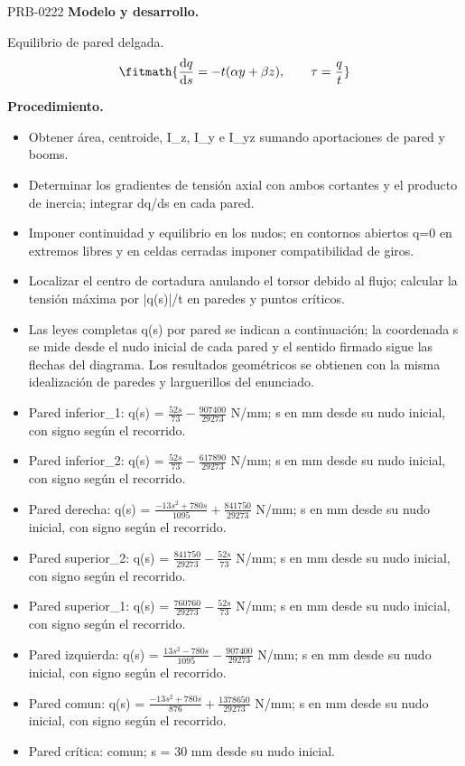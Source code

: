 \begin{studiumworked}{PRB-0222}
\textbf{Modelo y desarrollo.}

Equilibrio de pared delgada.\[\fitmath{\frac{\mathrm{d}q}{\mathrm{d}s}=-t(\alpha y+\beta z),\qquad \tau=\frac{q}{t}}\]

\textbf{Procedimiento.}\begin{itemize}\item Obtener área, centroide, I\_z, I\_y e I\_yz sumando aportaciones de pared y booms.
\item Determinar los gradientes de tensión axial con ambos cortantes y el producto de inercia; integrar dq/ds en cada pared.
\item Imponer continuidad y equilibrio en los nudos; en contornos abiertos q=0 en extremos libres y en celdas cerradas imponer compatibilidad de giros.
\item Localizar el centro de cortadura anulando el torsor debido al flujo; calcular la tensión máxima por |q(s)|/t en paredes y puntos críticos.
\item Las leyes completas q(s) por pared se indican a continuación; la coordenada s se mide desde el nudo inicial de cada pared y el sentido firmado sigue las flechas del diagrama. Los resultados geométricos se obtienen con la misma idealización de paredes y larguerillos del enunciado.
\item Pared inferior\_1: q(s) = $\frac{52 s}{73} - \frac{907400}{29273}$ N/mm; s en mm desde su nudo inicial, con signo según el recorrido.
\item Pared inferior\_2: q(s) = $\frac{52 s}{73} - \frac{617890}{29273}$ N/mm; s en mm desde su nudo inicial, con signo según el recorrido.
\item Pared derecha: q(s) = $\frac{- 13 s^{2} + 780 s}{1095} + \frac{841750}{29273}$ N/mm; s en mm desde su nudo inicial, con signo según el recorrido.
\item Pared superior\_2: q(s) = $\frac{841750}{29273} - \frac{52 s}{73}$ N/mm; s en mm desde su nudo inicial, con signo según el recorrido.
\item Pared superior\_1: q(s) = $\frac{760760}{29273} - \frac{52 s}{73}$ N/mm; s en mm desde su nudo inicial, con signo según el recorrido.
\item Pared izquierda: q(s) = $\frac{13 s^{2} - 780 s}{1095} - \frac{907400}{29273}$ N/mm; s en mm desde su nudo inicial, con signo según el recorrido.
\item Pared comun: q(s) = $\frac{- 13 s^{2} + 780 s}{876} + \frac{1378650}{29273}$ N/mm; s en mm desde su nudo inicial, con signo según el recorrido.
\item Pared crítica: comun; s = 30 mm desde su nudo inicial.\end{itemize}


\end{studiumworked}
